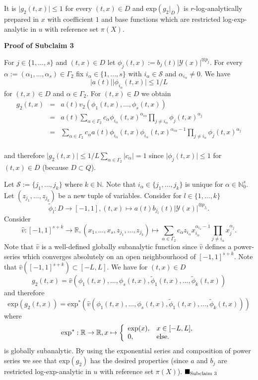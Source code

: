 \documentclass[12pt]{article}
\def\vs{\vspace}
\def\exp{\mathrm{exp}}
\begin{document}
\vs{0.1cm}
It is $\vert{g_2(t,x)}\vert \leq 1$ for every $(t,x) \in D$ and $\exp(g_2|_D)$ is $r$-log-analytically prepared in $x$ with coefficient $1$ and base functions which are restricted log-exp-analytic in $u$ with reference set $\pi(X)$.

\vs{0.4cm}
{\bf Proof of Subclaim 3}

\vs{0.1cm}
For $j \in \{1,...,s\}$ and $(t,x) \in D$ let $\phi_j(t,x):=b_j(t) \vert{\mathcal{Y}(x)}\vert^{\otimes p_j}$. For every $\alpha:=(\alpha_1,...,\alpha_s) \in \Gamma_2$ fix $i_\alpha \in \{1,...,s\}$ with $i_\alpha \in \mathcal{S}$ and $\alpha_{i_\alpha} \neq 0$. We have 
$$\vert{a(t)}\vert \vert{\phi_{i_\alpha}(t,x)}\vert \leq 1/L$$ 
for $(t,x) \in D$ and $\alpha \in \Gamma_2$. For $(t,x) \in D$ we obtain
\begin{eqnarray*}
	g_2(t,x) &=& a(t) v_2(\phi_1(t,x),...,\phi_s(t,x))\\
	&=& a(t)  \sum_{\alpha \in \Gamma_2}c_{\alpha} \phi_{i_{\alpha}}(t,x)^{\alpha_{i \alpha}} \prod_{j \neq i_{\alpha}} \phi_j(t,x)^{\alpha_j}\\
	&=&\sum_{\alpha \in \Gamma_2} c_{\alpha}a(t) \phi_{i_{\alpha}}(t,x) \phi_{i_{\alpha}}(t,x)^{\alpha_{i \alpha}-1} \prod_{j \neq i_{\alpha}} \phi_j(t,x)^{\alpha_j}\\
\end{eqnarray*}

and therefore $\vert{g_2(t,x)}\vert \leq 1/L \sum_{\alpha \in \Gamma_2} \vert{c_\alpha}\vert = 1$ since $\vert{\phi_j(t,x)}\vert \leq 1$ for $(t,x) \in D$ (because $D \subset Q$).

\vs{0.2cm}
Let $\mathcal{S}:=\{j_1,...,j_k\}$ where $k \in \mathbb{N}$. Note that $i_\alpha \in \{j_1,...,j_k\}$ is unique for $\alpha \in \mathbb{N}_0^s$. Let $(z_{j_1},...,z_{j_k})$ be a new tuple of variables. Consider for $l \in \{1,...,k\}$
$$\tilde{\phi}_l:D \to [-1,1], (t,x) \mapsto a(t)b_{j_l}(t)\vert{\mathcal{Y}(x)}\vert^{\otimes p_{j_l}}.$$
Consider 
$$\hat{v}:[-1,1]^{s+k} \to \mathbb{R}, (x_1,...,x_s,z_{j_1},...,z_{j_k}) \mapsto \sum_{\alpha \in \Gamma_2} c_{\alpha}z_{i_\alpha}x_{i_\alpha}^{\alpha_{i_\alpha}-1} \prod_{j \neq i_\alpha} x_j^{\alpha_j}.$$
Note that $\hat{v}$ is a well-defined globally subanalytic function since $\hat{v}$ defines a power-series which converges absolutely on an open neighbourhood of $[-1,1]^{s+k}$. Note that $\hat{v}([-1,1]^{s+k}) \subset [-L,L]$. We have for $(t,x) \in D$
$$g_2(t,x)=\hat{v}(\phi_1(t,x),...,\phi_s(t,x),\tilde{\phi}_1(t,x),...,\tilde{\phi}_k(t,x))$$
and therefore
$$\exp(g_2(t,x))=\exp^*(\hat{v}(\phi_1(t,x),...,\phi_s(t,x),\tilde{\phi}_1(t,x),...,\tilde{\phi}_k(t,x)))$$
where
$$\exp^*:\mathbb{R} \to \mathbb{R}, x \mapsto \left\{\begin{array}{ll} \exp(x), & x \in [-L,L], \\
	0, & \textnormal{else}. \end{array}\right.$$
is globally subanalytic. By using the exponential series and composition of power series we see that $\exp(g_2)$ has the desired properties (since $a$ and $b_j$ are restricted log-exp-analytic in $u$ with reference set $\pi(X)$). \hfill$\blacksquare_{\textnormal{Subclaim }3}$
\end{document}
